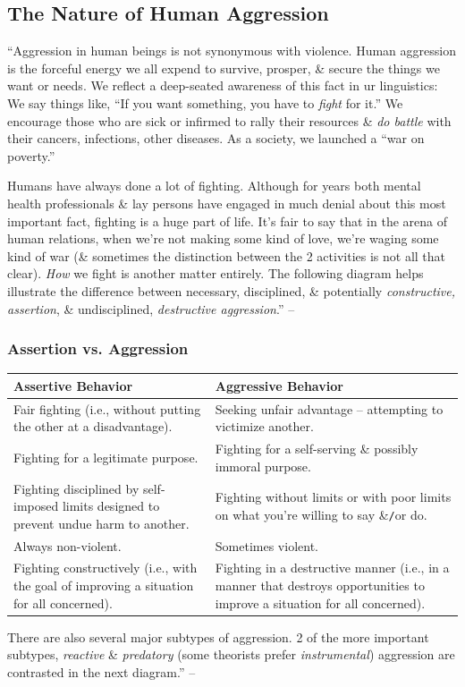 \documentclass{article}
\numberwithin{equation}{section}
\begin{document}
\subsection{The Nature of Human Aggression}
``Aggression in human beings is not synonymous with violence. Human aggression is the forceful energy we all expend to survive, prosper, \& secure the things we want or needs. We reflect a deep-seated awareness of this fact in ur linguistics: We say things like, ``If you want something, you have to \textit{fight} for it.'' We encourage those who are sick or infirmed to rally their resources \& \textit{do battle} with their cancers, infections, other diseases. As a society, we launched a ``war on poverty.''

Humans have always done a lot of fighting. Although for years both mental health professionals \& lay persons have engaged in much denial about this most important fact, fighting is a huge part of life. It's fair to say that in the arena of human relations, when we're not making some kind of love, we're waging some kind of war (\& sometimes the distinction between the 2 activities is not all that clear). \textit{How} we fight is another matter entirely. The following diagram helps illustrate the difference between necessary, disciplined, \& potentially \textit{constructive, assertion}, \& undisciplined, \textit{destructive aggression}.'' -- \cite[pp. 87--88]{Simon2011}

\subsubsection{Assertion vs. Aggression}

\begin{table}[H]
	\centering
	\begin{tabular}{|p{}|p{}|}
		\hline
		\textbf{Assertive Behavior} & \textbf{Aggressive Behavior} \\
		\hline
		Fair fighting (i.e., without putting the other at a disadvantage). & Seeking unfair advantage -- attempting to victimize another. \\
		\hline
		Fighting for a legitimate purpose. & Fighting for a self-serving \& possibly immoral purpose. \\
		\hline
		Fighting disciplined by self-imposed limits designed to prevent undue harm to another. & Fighting without limits or with poor limits on what you're willing to say \&\texttt{/}or do. \\
		\hline
		Always non-violent. & Sometimes violent. \\
		\hline
		Fighting constructively (i.e., with the goal of improving a situation for all concerned). & Fighting in a destructive manner (i.e., in a manner that destroys opportunities to improve a situation for all concerned). \\
		\hline
	\end{tabular}
\end{table}
There are also several major subtypes of aggression. 2 of the more important subtypes, \textit{reactive} \& \textit{predatory} (some theorists prefer \textit{instrumental}) aggression are contrasted in the next diagram.'' -- \cite[p. 88]{Simon2011}
\end{document}
